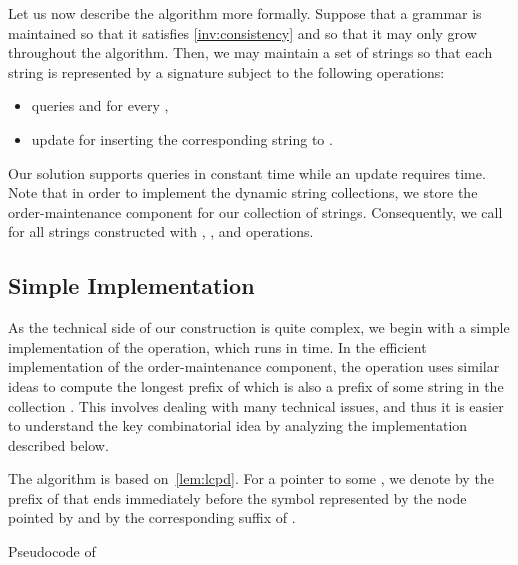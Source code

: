 \documentclass[a4paper]{article}
\theoremstyle{remark}
\begin{document}
Let us now describe the algorithm more formally.
Suppose that a grammar  is maintained so that it satisfies \cref{inv:consistency}
and so that it may only grow throughout the algorithm.
Then, we may maintain a set of strings  so that each string 
is represented by a signature  subject to the following operations:
\begin{itemize}
  \item queries  and  for every ,
  \item update  for    inserting the corresponding string  to .
\end{itemize}
Our solution supports queries in constant time while an update requires  time.
Note that in order to implement the dynamic string collections, we store the order-maintenance component
for our collection  of strings. Consequently, we call  for all strings
constructed with , , and  operations.

\subsection{Simple  Implementation}
As the technical side of our construction is quite complex, we begin with a simple implementation of the  operation,
which runs in  time.
In the efficient implementation of the order-maintenance component, the  operation uses similar ideas
to compute the longest prefix of  which is also a prefix of some string in the collection .
This involves dealing with many technical issues,  and thus it is easier to understand the key combinatorial idea by analyzing the  implementation described below.


The algorithm is based on~\cref{lem:lcpd}.
For a pointer  to some , we denote by  the prefix of  that ends immediately before the symbol represented by the node pointed by 
and by  the corresponding suffix of .


\begin{algorithm}
\begin{algorithmic}[1]
\Function{}{, }

\State 
\State 

\While{} \label{alg:samelevel_beg}
\State 
\EndWhile

\While{}
\State 
\EndWhile \label{alg:samelevel_end}

 \label{alg:lcp:for}
    \If{}\label{alg:lcp:cond}
    	\State \label{alg:lcp:k}
    	\State 
    	\State 
     \EndIf
    \State \Return 
   	\EndIf
    \If{}\label{alg:lcp:lcp}
    	\State 
    	\State 
    \EndIf
\EndFor
\State 
\State \Return  \label{line:return}
\EndFunction
\end{algorithmic}
\caption{Pseudocode of }
\label{alg:lcp}
\end{algorithm}
\end{document}
